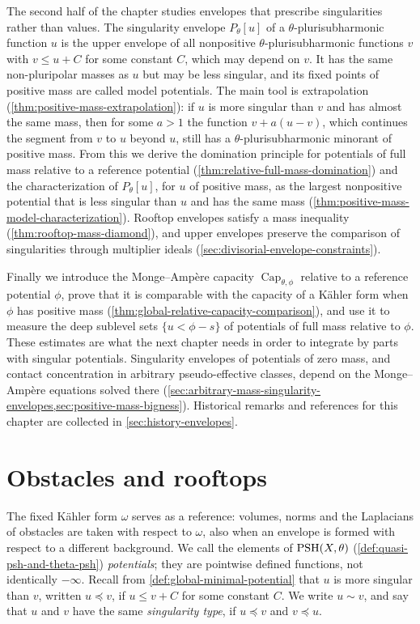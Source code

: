 The second half of the chapter studies envelopes that prescribe singularities rather than values. The singularity envelope $P_\theta[u]$ of a $\theta$-plurisubharmonic function $u$ is the upper envelope of all nonpositive $\theta$-plurisubharmonic functions $v$ with $v\leq u+C$ for some constant $C$, which may depend on $v$. It has the same non-pluripolar masses as $u$ but may be less singular, and its fixed points of positive mass are called model potentials. The main tool is extrapolation (\cref{thm:positive-mass-extrapolation}): if $u$ is more singular than $v$ and has almost the same mass, then for some $a>1$ the function $v+a(u-v)$, which continues the segment from $v$ to $u$ beyond $u$, still has a $\theta$-plurisubharmonic minorant of positive mass. From this we derive the domination principle for potentials of full mass relative to a reference potential (\cref{thm:relative-full-mass-domination}) and the characterization of $P_\theta[u]$, for $u$ of positive mass, as the largest nonpositive potential that is less singular than $u$ and has the same mass (\cref{thm:positive-mass-model-characterization}). Rooftop envelopes satisfy a mass inequality (\cref{thm:rooftop-mass-diamond}), and upper envelopes preserve the comparison of singularities through multiplier ideals (\cref{sec:divisorial-envelope-constraints}).

Finally we introduce the Monge--Amp\`ere capacity $\operatorname{Cap}_{\theta,\phi}$ relative to a reference potential $\phi$, prove that it is comparable with the capacity of a K\"ahler form when $\phi$ has positive mass (\cref{thm:global-relative-capacity-comparison}), and use it to measure the deep sublevel sets $\{u<\phi-s\}$ of potentials of full mass relative to $\phi$. These estimates are what the next chapter needs in order to integrate by parts with singular potentials. Singularity envelopes of potentials of zero mass, and contact concentration in arbitrary pseudo-effective classes, depend on the Monge--Amp\`ere equations solved there (\cref{sec:arbitrary-mass-singularity-envelopes,sec:positive-mass-bigness}). Historical remarks and references for this chapter are collected in \cref{sec:history-envelopes}.

\section{Obstacles and rooftops}
\label{sec:global-obstacle-envelopes}
The fixed K\"ahler form $\omega$ serves as a reference: volumes, norms and the Laplacians of obstacles are taken with respect to $\omega$, also when an envelope is formed with respect to a different background. We call the elements of $\mathrm{PSH}(X,\theta)$ (\cref{def:quasi-psh-and-theta-psh}) \emph{potentials}; they are pointwise defined functions, not identically $-\infty$. Recall from \cref{def:global-minimal-potential} that $u$ is more singular than $v$, written $u\preceq v$, if $u\leq v+C$ for some constant $C$. We write $u\sim v$, and say that $u$ and $v$ have the same \emph{singularity type}, if $u\preceq v$ and $v\preceq u$.

